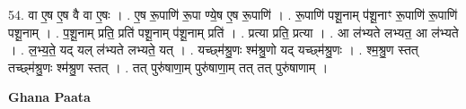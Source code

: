 \documentclass[17pt]{extarticle}
\begin{document}
54. वा ए॒ष ए॒ष वै वा ए॒षः । . ए॒ष रू॒पाणि॑ रू॒पा ण्ये॒ष ए॒ष रू॒पाणि॑ । . रू॒पाणि॑ पशू॒नाम् प॑शू॒नाꣳ रू॒पाणि॑ रू॒पाणि॑ पशू॒नाम् । . प॒शू॒नाम् प्रति॒ प्रति॑ पशू॒नाम् प॑शू॒नाम् प्रति॑ । . प्रत्या प्रति॒ प्रत्या । . आ ल॑भ्यते लभ्यत॒ आ ल॑भ्यते । . ल॒भ्य॒ते॒ यद् यल् ल॑भ्यते लभ्यते॒ यत् । . यच्छ्म॑श्रु॒णः श्म॑श्रु॒णो यद् यच्छ्म॑श्रु॒णः । . श्म॒श्रु॒ण स्तत् तच्छ्म॑श्रु॒णः श्म॑श्रु॒ण स्तत् । . तत् पुरु॑षाणा॒म् पुरु॑षाणा॒म् तत् तत् पुरु॑षाणाम् । \newline

\textbf{Ghana Paata } \newline
\end{document}
